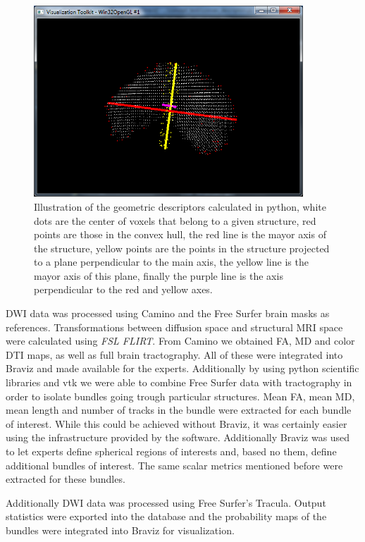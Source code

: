 \begin{figure}
	\centering
		\includegraphics[width=0.9\textwidth]{figures/kmc400/desc_4}
	\caption{Illustration of the geometric descriptors calculated in python, white dots are the center of voxels that belong to a given structure, red points are those in the convex hull, the red line is the mayor axis of the structure, yellow points are the points in the structure projected to a plane perpendicular to the main axis, the yellow line is the mayor axis of this plane, finally the purple line is the axis perpendicular to the red and yellow axes.}
	\label{fig_jth_descs}
\end{figure}

DWI data was processed using Camino and the Free Surfer brain masks as references. Transformations between diffusion space and structural MRI space were calculated using \emph{FSL FLIRT}. From Camino we obtained FA, MD and color DTI maps, as well as full brain tractography. All of these were integrated into Braviz and made available for the experts. Additionally by using python scientific libraries and vtk we were able to combine Free Surfer data with tractography in order to isolate bundles going trough particular structures. Mean FA, mean MD, mean length and number of tracks in the bundle were extracted for each bundle of interest.  While this could be achieved without Braviz, it was certainly easier using the infrastructure provided by the software. Additionally Braviz was used to let experts define spherical regions of interests and, based no them, define additional bundles of interest. The same scalar metrics mentioned before were extracted for these bundles. 

Additionally DWI data was processed using Free Surfer's Tracula. Output statistics were exported into the database and the probability maps of the bundles were integrated into Braviz for visualization. 

